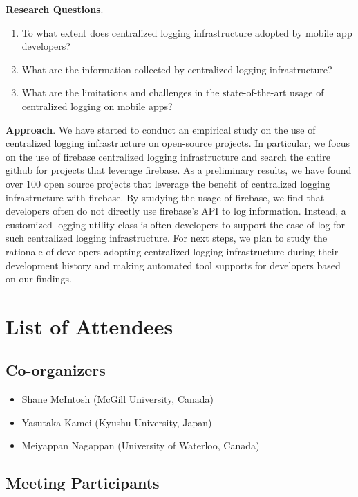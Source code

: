 \documentclass[a4paper]{article}
\newcommand{\smallsection}[1]{\noindent \textbf{#1}. }
\begin{document}
\vspace{2mm}
\smallsection{Research Questions}

\begin{enumerate}[\bfseries RQ1]
\item To what extent does centralized logging infrastructure adopted by mobile app developers?
\item What are the information collected by centralized logging infrastructure?
\item What are the limitations and challenges in the state-of-the-art usage of centralized logging on mobile apps?
\end{enumerate}

\smallsection{Approach}
We have started to conduct an empirical study on the use of centralized logging infrastructure on open-source projects. In particular, we focus on the use of firebase centralized logging infrastructure and search the entire github for projects that leverage firebase. As a preliminary results, we have found over 100 open source projects that leverage the benefit of centralized logging infrastructure with firebase. By studying the usage of firebase, we find that developers often do not directly use firebase's API to log information. Instead, a customized logging utility class is often developers to support the ease of log for such centralized logging infrastructure. For next steps, we plan to study the rationale of developers adopting centralized logging infrastructure during their development history and making automated tool supports for developers based on our findings.

\clearpage

\section{List of Attendees}

\subsection{Co-organizers}

\begin{itemize}
\item Shane McIntosh (McGill University, Canada)
\item Yasutaka Kamei (Kyushu University, Japan)
\item Meiyappan Nagappan (University of Waterloo, Canada)
\end{itemize}

\subsection{Meeting Participants}
\end{document}
